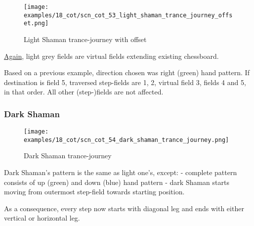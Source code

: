 \clearpage %

\noindent
\begin{figure}[!h]
\texttt{[image: examples/18\_cot/scn\_cot\_53\_light\_shaman\_trance\_journey\_offset.png]}
\caption{Light Shaman trance-journey with offset}
\label{fig:scn_cot_53_light_shaman_trance_journey_offset}
\end{figure}

\hyperref[fig:scn_hd_06_centaur_off_board]{Again},
light grey fields are virtual fields extending existing chessboard.

Based on a previous example, direction chosen was right (green) hand pattern.
If destination is field 5, traversed step-fields are 1, 2, virtual field 3,
fields 4 and 5, in that order. All other (step-)fields are not affected.

\clearpage %

\subsubsection*{Dark Shaman}
\label{sec:Conquest of Tlalocan/Trance-journey/Movement/Dark Shaman}

\vspace*{-1.5\baselineskip}
\noindent
\begin{figure}[!h]
\texttt{[image: examples/18\_cot/scn\_cot\_54\_dark\_shaman\_trance\_journey.png]}
\vspace*{-1.4\baselineskip}
\caption{Dark Shaman trance-journey}
\label{fig:scn_cot_54_dark_shaman_trance_journey}
\end{figure}

\vspace*{-0.5\baselineskip}
Dark Shaman's pattern is the same as light one's, except: \newline
- complete pattern consists of up (green) and down (blue) hand pattern \newline
- dark Shaman starts moving from outermost step-field towards starting position.

As a consequence, every step now starts with diagonal leg and ends with either
vertical or horizontal leg.

